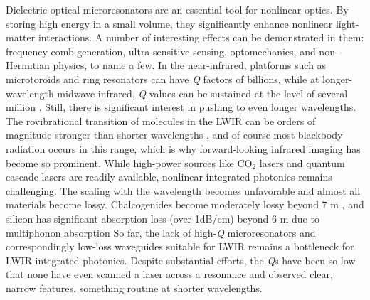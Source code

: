 \documentclass[fleqn,10pt,twocolumn]{wlscirep}
\begin{document}
Dielectric optical microresonators are an essential tool for nonlinear optics. By storing high energy in a small volume, they significantly enhance nonlinear light-matter interactions. A number of interesting effects can be demonstrated in them: frequency comb generation\cite{delhayeOpticalFrequencyComb2007,gaeta2019photonic}, ultra-sensitive sensing\cite{armani2007label,guggenheim2017ultrasensitive}, optomechanics\cite{anetsberger2008ultralow,wiederhecker2009controlling}, and non-Hermitian physics\cite{peng2014parity,chang2014parity,cao2015dielectric}, to name a few.
In the near-infrared, platforms such as  microtoroids \cite{armaniUltrahighToroidMicrocavity2003} and  ring resonators\cite{pfeiffer2018ultra} can have \emph{Q} factors of billions, while at longer-wavelength midwave infrared,  \emph{Q} values can be sustained at the level of several million \cite{luke2015broadband}. Still, there is significant interest in pushing to even longer wavelengths. The rovibrational transition of molecules in the LWIR can be orders of magnitude stronger than shorter wavelengths \cite{brown2003absorption,webber2005optical,kasahara2018noninvasive,jernelv2019review}, and of course most blackbody radiation occurs in this range, which is why forward-looking infrared imaging has become so prominent. While high-power sources like CO$_2$ lasers and quantum cascade lasers\cite{hugiMidinfraredFrequencyComb2012,mengBroadlyTunableSinglemode2015,luHighPowerFrequency2015,hillbrandCoherentInjectionLocking2019,mengMidinfraredFrequencyComb2020} are readily available, nonlinear integrated photonics remains challenging. The scaling with the wavelength becomes unfavorable and almost all materials become lossy. Chalcogenides become moderately lossy beyond 7 \micro m \cite{fengFewmodedUltralargeMode2020}, and
silicon has significant absorption loss (over 1dB/cm) beyond 6 \micro m due to multiphonon absorption\cite{millerLowlossSiliconPlatform2017,bendow1977multiphonon}
So far, the lack of high-\emph{Q} microresonators and correspondingly low-loss waveguides suitable for LWIR remains a bottleneck for LWIR integrated photonics. Despite substantial efforts\cite{ramirez2019broadband,leeHighQDiamondMicroresonators2020,kozakGermaniumonsiliconWaveguidesLongwave2021}, the \emph{Q}s have been so low that none have even scanned a laser across a resonance and observed clear, narrow features, something routine at shorter wavelengths.
\end{document}
